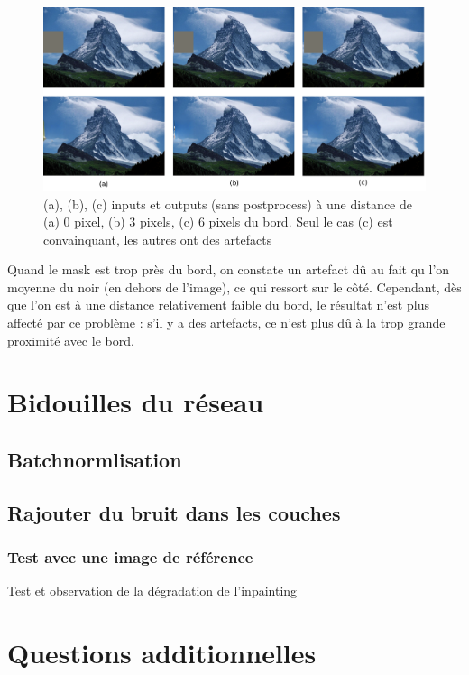 \documentclass[12pt]{article}
\begin{document}
\begin{figure}[H]
    \includegraphics[width=1.0\textwidth]{padding.png}
    \caption{(a), (b), (c) inputs et outputs (sans postprocess) à une distance de (a) 0 pixel, (b) 3 pixels, (c) 6 pixels du bord. Seul le cas (c) est convainquant, les autres ont des artefacts}
\end{figure}

Quand le mask est trop près du bord, on constate un artefact dû au fait qu l'on moyenne du noir (en dehors de l'image), ce qui ressort sur le côté. Cependant, dès que l'on est à une distance relativement faible du bord, le résultat n'est plus affecté par ce problème : s'il y a des artefacts, ce n'est plus dû à la trop grande proximité avec le bord.

\section{Bidouilles du réseau}



\subsection{Batchnormlisation}


\subsection{Rajouter du bruit dans les couches}

\subsubsection{Test avec une image de référence}
Test et observation de la dégradation de l'inpainting

\section{Questions additionnelles}
\end{document}
